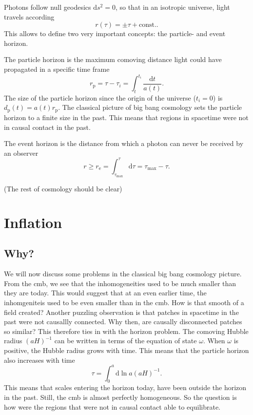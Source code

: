 \documentclass[12pt]{article}
\begin{document}
Photons follow null geodesics $\mathrm{d}s^2 = 0$, so that in an isotropic universe, light travels according
\begin{equation}
    r(\tau) = \pm \tau + \mathrm{ const.}.
\end{equation}
This allows to define two very important concepts: the particle- and event horizon.

The particle horizon is the maximum comoving distance light could have propagated in a specific time frame
\begin{equation}
    r_{\mathrm{p}} = \tau - \tau_i = \int_{t}^{t_i} \frac{\mathrm{d}t}{a(t)}.
\end{equation}
The size of the particle horizon since the origin of the universe ($t_i = 0$) is $d_\mathrm{p}(t) = a(t) r_{\mathrm{p}}$. The classical picture of big bang cosmology sets the particle horizon to a finite size in the past. This means that regions in spacetime were not in causal contact in the past. 

The event horizon is the distance from which a photon can never be received by an observer
\begin{equation}
    r \geq r_\mathrm{e} = \int_{\tau_\mathrm{max}}^{\tau} \mathrm{d}\tau = \tau_\mathrm{max} - \tau.
\end{equation}

(The rest of cosmology should be clear)


\section{Inflation}
\subsection{Why?}
We will    now discuss some problems in the classical big bang cosmology picture. From the cmb, we see that the inhomogeneities used to be much smaller than they are today. This would suggest that at an even earlier time, the inhomgeniteis used to be even smaller than in the cmb. How is that smooth of a field created? Another puzzling observation is that patches in spacetime in the past were not causallly connected. Why then, are causally disconnected patches so similar? This therefore ties in with the horizon problem. The comoving Hubble radius $(aH)^{-1}$ can be written in terms of the equation of state $\omega$. When $\omega$ is positive, the Hubble radius grows with time. This means that the particle horizon also increases with time 
\begin{equation}
    \tau = \int_{0}^{a}\mathrm{d}\ln a (aH)^{-1}.
\end{equation}
This means that scales entering the horizon today, have been outside the horizon in the past. Still, the cmb is almost perfectly homogeneous. So the question is how were the regions that were not in causal contact able to equilibrate.
\end{document}

